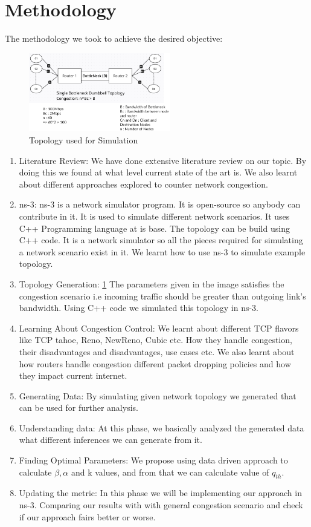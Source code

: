 \section{Methodology}
The methodology we took to achieve the desired objective:
\begin{figure}[h]
    \centering
    \includegraphics[width=0.55\textwidth]{./images/topology.png}
    \caption{\label{fig:myfig2} Topology used for Simulation}
\end{figure}
\begin{enumerate}
    \item Literature Review: We have done extensive literature review on our topic. By doing this we found at what level current state of the art is. We also learnt about different approaches explored to counter network congestion.
    \item ns-3: ns-3 is a network simulator program. It is open-source so anybody can contribute in it. It is used to simulate different network scenarios. It uses C++ Programming language at is base. The topology can be build using C++ code. It is a network simulator so all the pieces required for simulating a network scenario exist in it. We learnt how to use ns-3 to simulate example topology.
    \item Topology Generation: \ref{fig:myfig2} The parameters given in the image satisfies the congestion scenario i.e incoming traffic should be greater than outgoing link's bandwidth. Using C++ code we simulated this topology in ns-3.
    \item Learning About Congestion Control: We learnt about different TCP flavors like TCP tahoe, Reno, NewReno, Cubic etc. How they handle congestion, their disadvantages and disadvantages, use cases etc. We also learnt about how routers handle congestion different packet dropping policies and how they impact current internet.
    \item Generating Data: By simulating given network topology we generated that can be used for further analysis.
    \item Understanding data: At this phase, we basically analyzed the generated data what different inferences we can generate from it.
    \item Finding Optimal Parameters: We propose using data driven approach to calculate \( \beta, \alpha \) and k values, and from that we can calculate value of \( q_{th} \). 
    \item Updating the metric: In this phase we will be implementing our approach in ns-3. Comparing our results with with general congestion scenario and check if our approach fairs better or worse.
\end{enumerate}

